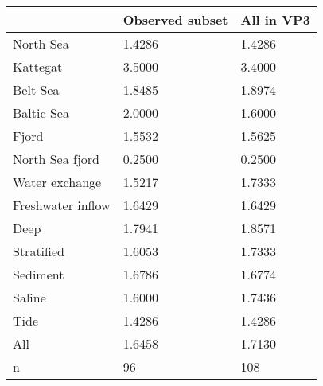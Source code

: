 \begin{tabular}{lll}
\toprule
 & Observed subset & All in VP3 \\
\midrule
North Sea & 1.4286 & 1.4286 \\
Kattegat & 3.5000 & 3.4000 \\
Belt Sea & 1.8485 & 1.8974 \\
Baltic Sea & 2.0000 & 1.6000 \\
Fjord & 1.5532 & 1.5625 \\
North Sea fjord & 0.2500 & 0.2500 \\
Water exchange & 1.5217 & 1.7333 \\
Freshwater inflow & 1.6429 & 1.6429 \\
Deep & 1.7941 & 1.8571 \\
Stratified & 1.6053 & 1.7333 \\
Sediment & 1.6786 & 1.6774 \\
Saline & 1.6000 & 1.7436 \\
Tide & 1.4286 & 1.4286 \\
All & 1.6458 & 1.7130 \\
n & 96 & 108 \\
\bottomrule
\end{tabular}
